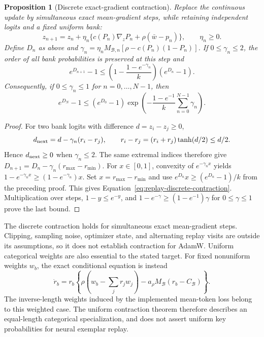 \documentclass{article}
\newcommand{\enforcehalffinalproseline}{%
  \setlength{\parfillskip}{0pt plus .20\linewidth}}
\newcommand{\1}{\mathbf 1}
\newtheorem{proposition}[lemma]{Proposition}
\theoremstyle{remark}
\theoremstyle{definition}
\theoremstyle{plain}
\begin{document}
\begin{proposition}[Discrete exact-gradient contraction]
\enforcehalffinalproseline
\label{prop:replay-discrete-contraction}
Replace the continuous update by simultaneous exact mean-gradient steps,
while retaining independent logits and a fixed uniform bank:
\[
 z_{n+1}=z_n+\eta_n\{c(P_n)\nabla_zP_n+
                         \rho(\bar w-p_n)\},\qquad \eta_n\ge0.
\]
Define $D_n$ as above and
$\gamma_n=\eta_n M_{\mathcal B,n}
 [\rho-c(P_n)(1-P_n)]$.
If $0\le\gamma_n\le2$, the order of all bank probabilities is preserved
at this step and
\begin{equation}
 e^{D_{n+1}}-1\le
 \left(1-\frac{1-e^{-\gamma_n}}{k}\right)(e^{D_n}-1).
 \label{eq:replay-discrete-contraction}
\end{equation}
Consequently, if $0\le\gamma_n\le1$ for $n=0,\ldots,N-1$, then
\[
 e^{D_N}-1\le(e^{D_0}-1)
  \exp\!\left(-\frac{1-e^{-1}}{k}
                    \sum_{n=0}^{N-1}\gamma_n\right).
\]
\end{proposition}

\begin{proof}
\enforcehalffinalproseline
For two bank logits with difference $d=z_i-z_j\ge0$,
\[
 d_{\rm next}=d-\gamma_n(r_i-r_j),\qquad
 r_i-r_j=(r_i+r_j)\tanh(d/2)\le d/2.
\]
Hence $d_{\rm next}\ge0$ when $\gamma_n\le2$. The same extremal indices
therefore give
$D_{n+1}=D_n-\gamma_n(r_{\max}-r_{\min})$.
For $x\in[0,1]$, convexity of $e^{-\gamma_nx}$ yields
$1-e^{-\gamma_nx}\ge(1-e^{-\gamma_n})x$. Set
$x=r_{\max}-r_{\min}$ and use
$e^{D_n}x\ge(e^{D_n}-1)/k$ from the preceding proof. This gives
Equation~\eqref{eq:replay-discrete-contraction}. Multiplication over steps,
$1-y\le e^{-y}$, and
$1-e^{-\gamma}\ge(1-e^{-1})\gamma$ for $0\le\gamma\le1$ prove the last
bound.
\end{proof}

The discrete contraction holds for simultaneous exact mean-gradient
steps. Clipping, sampling noise, optimizer state, and alternating replay
visits are outside its assumptions, so it does not establish contraction
for AdamW. Uniform categorical weights are also essential to the stated target.
For fixed nonuniform weights $w_b$, the exact conditional equation is instead
\begin{equation}
 \dot r_b=r_b\left\{
   \rho\left(w_b-\sum_jr_jw_j\right)
   -a_\rho M_{\mathcal B}(r_b-C_{\mathcal B})\right\}.
 \label{eq:replay-finite-weighted}
\end{equation}
The inverse-length weights induced by the implemented mean-token loss belong
to this weighted case. The uniform contraction theorem therefore describes
an equal-length categorical specialization, and does not assert uniform key
probabilities for neural exemplar replay.
\end{document}
